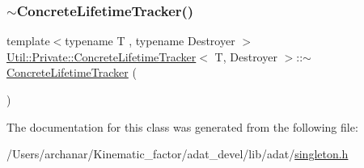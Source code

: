 \mbox{\label{classUtil_1_1Private_1_1ConcreteLifetimeTracker_a46aa326f024ef9d7301b84af803c5fb0}} 
\subsubsection{\texorpdfstring{$\sim$ConcreteLifetimeTracker()}{~ConcreteLifetimeTracker()}\hspace{0.1cm}{\footnotesize\ttfamily [2/2]}}
{\footnotesize\ttfamily template$<$typename T , typename Destroyer $>$ \\
\mbox{\hyperlink{classUtil_1_1Private_1_1ConcreteLifetimeTracker}{Util\+::\+Private\+::\+Concrete\+Lifetime\+Tracker}}$<$ T, Destroyer $>$\+::$\sim$\mbox{\hyperlink{classUtil_1_1Private_1_1ConcreteLifetimeTracker}{Concrete\+Lifetime\+Tracker}} (\begin{DoxyParamCaption}{ }\end{DoxyParamCaption})\hspace{0.3cm}{\ttfamily [inline]}}



The documentation for this class was generated from the following file\+:\begin{DoxyCompactItemize}
\item 
/\+Users/archanar/\+Kinematic\+\_\+factor/adat\+\_\+devel/lib/adat/\mbox{\hyperlink{lib_2adat_2singleton_8h}{singleton.\+h}}\end{DoxyCompactItemize}
